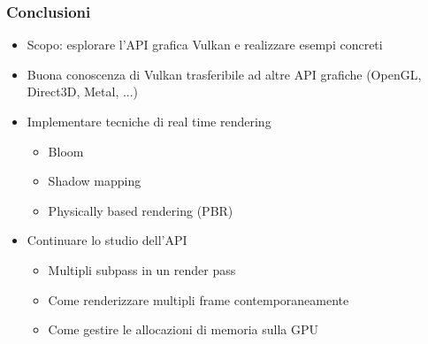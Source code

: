 \begin{frame}
\frametitle{Conclusioni}
\begin{itemize}
\item Scopo: esplorare l'API grafica Vulkan e realizzare esempi concreti
\item Buona conoscenza di Vulkan trasferibile ad altre API grafiche (OpenGL, Direct3D, Metal, ...)
\item Implementare tecniche di real time rendering
\begin{itemize}
\item Bloom
\item Shadow mapping
\item Physically based rendering (PBR)
\end{itemize}
\item Continuare lo studio dell'API
\begin{itemize}
\item Multipli subpass in un render pass
\item Come renderizzare multipli frame contemporaneamente
\item Come gestire le allocazioni di memoria sulla GPU
\end{itemize}
\end{itemize}
\end{frame}
